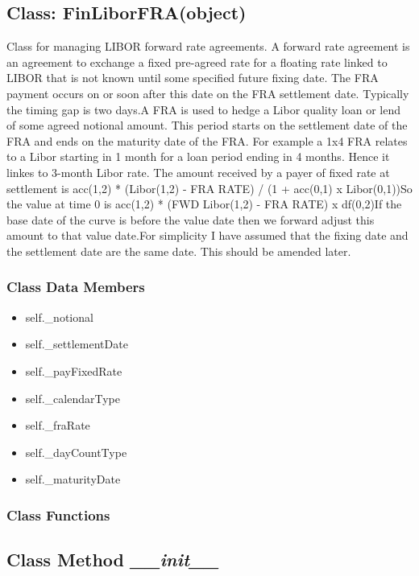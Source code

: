\documentclass[twoside,11pt]{book}
\begin{document}
\subsection{Class: FinLiborFRA(object)}
Class for managing LIBOR forward rate agreements. A forward rate agreement is an agreement to exchange a fixed pre-agreed rate for a floating rate linked to LIBOR that is not known until some specified future fixing date. The FRA payment occurs on or soon after this date on the FRA settlement date. Typically the timing gap is two days.A FRA is used to hedge a Libor quality loan or lend of some agreed notional amount. This period starts on the settlement date of the FRA and ends on the maturity date of the FRA. For example a 1x4 FRA relates to a Libor starting in 1 month for a loan period ending in 4 months. Hence it linkes to 3-month Libor rate. The amount received by a payer of fixed rate at settlement is acc(1,2) * (Libor(1,2) - FRA RATE) / (1 + acc(0,1) x Libor(0,1))So the value at time 0 is acc(1,2) * (FWD Libor(1,2) - FRA RATE) x df(0,2)If the base date of the curve is before the value date then we forward adjust this amount to that value date.For simplicity I have assumed that the fixing date and the settlement date are the same date. This should be amended later. 

\subsubsection{Class Data Members}
\begin{itemize}
\item{self.\_notional}
\item{self.\_settlementDate}
\item{self.\_payFixedRate}
\item{self.\_calendarType}
\item{self.\_fraRate}
\item{self.\_dayCountType}
\item{self.\_maturityDate}
\end{itemize}

\subsubsection{Class Functions}

\subsection{Class Method {\it \_\_init\_\_}}
\end{document}
